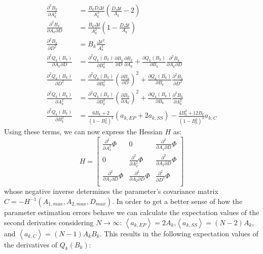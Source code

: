 \documentclass[%
 reprint,
 amsmath,amssymb,
 aps,
]{revtex4-1}
\begin{document}
\begin{equation}
	\begin{aligned}
		\frac{\partial^{2} B_{k}}{\partial A_{k}^{2}} &=\frac{B_{k}D\Delta t}{A_{k}^{3}}\left(\frac{D\Delta t}{A_{k}}-2\right) \\
		\frac{\partial^{2} B_{k}}{\partial A_{k}\partial D} & = \frac{B_{k}\Delta t}{A_{k}^{2}}\left(1-\frac{D\Delta t}{A_{k}}\right)\\
		\frac{\partial^{2} B_{k}}{\partial D^{2}} &= B_{k}\frac{\Delta t^{2}}{A_{k}^{2}}\\
		\frac{\partial^{2} Q_{k}(B_{k})}{\partial A_{k}\partial D} &= 
		\frac{\partial^{2} Q_{k}(B_{k})}{\partial B_{k}^{2}}\frac{\partial B_{k}}{\partial D}\frac{\partial B_{k}}{\partial A_{k}}
		+\frac{\partial Q_{k}(B_{k})}{\partial B_{k}}\frac{\partial^{2} B_{k}}{\partial A_{k}\partial D}\\
		\frac{\partial^{2}Q_{k}(B_{k})}{\partial D^{2}} &= \frac{\partial^{2}Q_{k}(B_{k})}{\partial B_{k}^{2}}\left(\frac{\partial B_{k}}{\partial D}\right)^{2}
		+\frac{\partial Q_{k}(B_{k})}{\partial B_{k}}\frac{\partial^{2}B_{k}}{\partial D^{2}}\\
		\frac{\partial^{2}Q_{k}(B_{k})}{\partial A_{k}^{2}} &= 
		\frac{\partial^{2}Q_{k}(B_{k})}{\partial B_{k}^{2}}\left(\frac{\partial B_{k}}{\partial A_{k}}\right)^{2}
		+\frac{\partial Q_{k}(B_{k})}{\partial B_{k}}\frac{\partial^{2}B_{k}}{\partial A_{k}^{2}}\\
		\frac{\partial^{2}Q_{k}(B_{k})}{\partial B_{k}^{2}} &= \frac{6B_{k}+2}{(1-B_{k}^{2})^{3}}\left(a_{k,EP}+2a_{k,SS}\right)
		-\frac{4B_{k}^{3}+12B_{k}}{(1-B_{k}^{2})^{3}}a_{k,C}
	\end{aligned}
\end{equation}
Using these terms, we can now express the Hessian $H$ as:
\begin{equation}H=
\begin{bmatrix} 
\frac{\partial^{2}}{\partial A_{1}^2}\Phi & 0 & \frac{\partial^{2}}{\partial A_{1}\partial D}\Phi \\
0 & \frac{\partial^{2}}{\partial A_{2}^2}\Phi & \frac{\partial^{2}}{\partial A_{2}\partial D}\Phi \\
\frac{\partial^{2}}{\partial A_{1}\partial D}\Phi & \frac{\partial^{2}}{\partial A_{2}\partial D}\Phi & \frac{\partial^{2}}{\partial D^2}\Phi\\
\end{bmatrix}
\end{equation}
whose negative inverse determines the parameter's covariance matrix $C = -H^{-1}(A_{1,max},A_{2,max},D_{max})$. In order to get a better sense of how the parameter estimation errors behave we can calculate the expectation values of the second derivaties considering $N\rightarrow \infty$: $\left\langle a_{k,EP} \right\rangle=2A_{k}$,$\left\langle a_{k,SS} \right\rangle=(N-2)A_{k}$, and $\left\langle a_{k,C} \right\rangle=(N-1)A_{k}B_{k}$.  This results in the following expectation values of the derivatives of $Q_{k}(B_{k})$:
\end{document}
